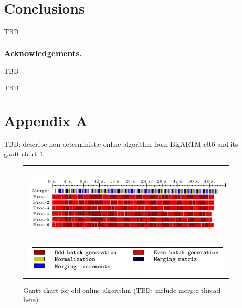 \documentclass[russian,english]{llncs}
\newcommand{\kw}[1]{\textsf{#1}}
\begin{document}
\section{Conclusions}
\label{sec:Conclusions}

TBD

\bigskip
\subsubsection*{Acknowledgements.}

TBD

%
%

\begin{thebibliography}{10}

TBD

\end{thebibliography}

\newpage
\section*{Appendix A}
\label{sec:Appendix}

TBD: describe non-deterministic online algorithm from \kw{BigARTM $v0.6$} and its gantt chart \ref{fig:gantt:oldonline}.



\begin{figure}[t]
	\centering
	\begin{tabular}{c}
		\includegraphics[height=4cm, width=12cm]{plots/plot_nytimes_model_v06_300.pdf} \\
		\includegraphics[scale=1]{plots/plot_legend_model_v06.pdf}
	\end{tabular}
	\caption{Gantt chart for old online algorithm (TBD: include merger thread here)} \label{fig:gantt:oldonline}
\end{figure}
\end{document}
